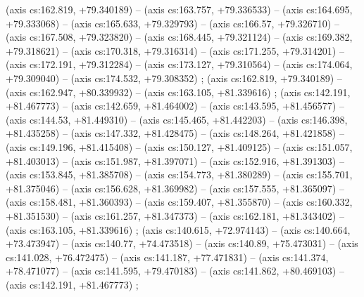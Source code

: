     (axis cs:162.819,    +79.340189) --  (axis cs:163.757,    +79.336533) --  (axis cs:164.695,    +79.333068) --  (axis cs:165.633,    +79.329793) --  (axis cs:166.57,    +79.326710) --  (axis cs:167.508,    +79.323820) --  (axis cs:168.445,    +79.321124) --  (axis cs:169.382,    +79.318621) --  (axis cs:170.318,    +79.316314) --  (axis cs:171.255,    +79.314201) --  (axis cs:172.191,    +79.312284) --  (axis cs:173.127,    +79.310564) --  (axis cs:174.064,    +79.309040) --  (axis cs:174.532,    +79.308352) ;
    (axis cs:162.819,    +79.340189) --  (axis cs:162.947,    +80.339932) --  (axis cs:163.105,    +81.339616) ;
    (axis cs:142.191,    +81.467773) --  (axis cs:142.659,    +81.464002) --  (axis cs:143.595,    +81.456577) --  (axis cs:144.53,    +81.449310) --  (axis cs:145.465,    +81.442203) --  (axis cs:146.398,    +81.435258) --  (axis cs:147.332,    +81.428475) --  (axis cs:148.264,    +81.421858) --  (axis cs:149.196,    +81.415408) --  (axis cs:150.127,    +81.409125) --  (axis cs:151.057,    +81.403013) --  (axis cs:151.987,    +81.397071) --  (axis cs:152.916,    +81.391303) --  (axis cs:153.845,    +81.385708) --  (axis cs:154.773,    +81.380289) --  (axis cs:155.701,    +81.375046) --  (axis cs:156.628,    +81.369982) --  (axis cs:157.555,    +81.365097) --  (axis cs:158.481,    +81.360393) --  (axis cs:159.407,    +81.355870) --  (axis cs:160.332,    +81.351530) --  (axis cs:161.257,    +81.347373) --  (axis cs:162.181,    +81.343402) --  (axis cs:163.105,    +81.339616) ;
    (axis cs:140.615,    +72.974143) --  (axis cs:140.664,    +73.473947) --  (axis cs:140.77,    +74.473518) --  (axis cs:140.89,    +75.473031) --  (axis cs:141.028,    +76.472475) --  (axis cs:141.187,    +77.471831) --  (axis cs:141.374,    +78.471077) --  (axis cs:141.595,    +79.470183) --  (axis cs:141.862,    +80.469103) --  (axis cs:142.191,    +81.467773) ;
